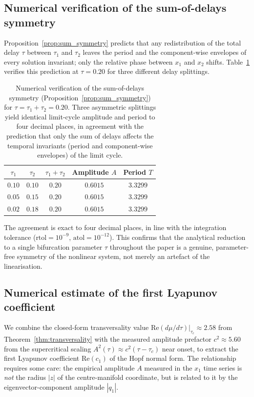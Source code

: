 \documentclass[sn-mathphys,Numbered]{sn-jnl}
\theoremstyle{thmstyleone}
\theoremstyle{thmstyletwo}
\theoremstyle{thmstylethree}
\begin{document}
\subsection{Numerical verification of the sum-of-delays symmetry}
\label{sec:asymmetric_check}

Proposition~\ref{prop:sum_symmetry} predicts that any redistribution of
the total delay $\tau$ between $\tau_1$ and $\tau_2$ leaves the period
and the component-wise envelopes of every solution invariant; only the
relative phase between $x_1$ and $x_2$ shifts. Table~\ref{tab:asymmetric}
verifies this prediction at $\tau=0.20$ for three different delay
splittings.

\begin{table}
\centering
\caption{Numerical verification of the sum-of-delays symmetry
(Proposition~\ref{prop:sum_symmetry}) for $\tau=\tau_1+\tau_2=0.20$.
Three asymmetric splittings yield identical limit-cycle amplitude and
period to four decimal places, in agreement with the prediction that
only the sum of delays affects the temporal invariants (period and
component-wise envelopes) of the limit cycle.}
\label{tab:asymmetric}
\begin{tabular}{ccccc}
\toprule
$\tau_1$ & $\tau_2$ & $\tau_1+\tau_2$ & Amplitude $A$ & Period $T$ \\
\midrule
$0.10$ & $0.10$ & $0.20$ & $0.6015$ & $3.3299$ \\
$0.05$ & $0.15$ & $0.20$ & $0.6015$ & $3.3299$ \\
$0.02$ & $0.18$ & $0.20$ & $0.6015$ & $3.3299$ \\
\bottomrule
\end{tabular}
\end{table}

The agreement is exact to four decimal places, in line with the
integration tolerance ($\text{rtol}=10^{-9}$, $\text{atol}=10^{-12}$).
This confirms that the analytical reduction to a single bifurcation
parameter $\tau$ throughout the paper is a genuine, parameter-free
symmetry of the nonlinear system, not merely an artefact of the
linearisation.

\subsection{Numerical estimate of the first Lyapunov coefficient}
\label{sec:l1_numerics}

We combine the closed-form transversality value
$\mathrm{Re}(d\mu/d\tau)|_{\tau_c}\approx 2.58$ from
Theorem~\ref{thm:transversality} with the measured amplitude prefactor
$c^2\approx 5.60$ from the supercritical scaling
$A^2(\tau)\approx c^2(\tau-\tau_c)$ near onset, to extract the first
Lyapunov coefficient $\mathrm{Re}(c_1)$ of the Hopf normal form. The
relationship requires some care: the empirical amplitude $A$ measured
in the $x_1$ time series is \emph{not} the radius $|z|$ of the
centre-manifold coordinate, but is related to it by the
eigenvector-component amplitude $|q_1|$.
\end{document}
